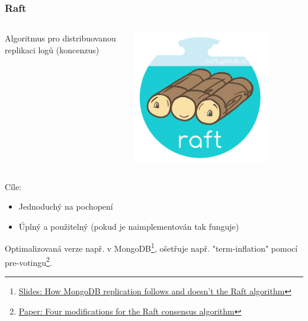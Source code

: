 \documentclass[usenames,dvipsnames,9pt]{beamer}
\begin{document}
\begin{frame}
  \frametitle{Raft}

  \begin{columns}
    \begin{column}{0.7\textwidth}
      \begin{center}
        \LARGE Algoritmus pro distribuovanou replikaci logů (koncenzus)
      \end{center}
    \end{column}
    \begin{column}{0.3\textwidth}
        \begin{center}
        \includegraphics[width=0.8\textwidth]{12/figs/raft_logo.png}
        \end{center}
    \end{column}
  \end{columns}

  \pause
  Cíle:
  \begin{itemize}
    \item Jednoduchý na pochopení 
    \item Úplný a použitelný (pokud je naimplementován tak funguje) 
  \end{itemize}  


  \vspace{1em}
  \pause
  Optimalizovaná verze např. v MongoDB\footnote{\href{https://henrikingo.github.io/presentations/PGDay\%20Russia\%202017\%20-\%20MongoDB\%20and\%20Raft/\#/title}{Slides: How MongoDB replication follows and doesn't the Raft algorithm}},
  ošetřuje např. "term-inflation" pomocí pre-votingu\footnote{\href{https://www.openlife.cc/sites/default/files/php_uploads/4-modifications-for-Raft-consensus.pdf}{Paper: Four modifications for the Raft consensus algorithm}}.
\end{frame}
\end{document}
